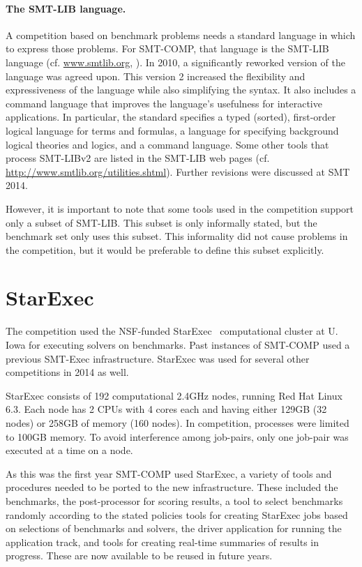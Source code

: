 \documentclass[twoside,11pt]{article}
\begin{document}
\paragraph{The SMT-LIB language.} A competition based on benchmark problems needs a standard language in which to express those problems.
For SMT-COMP, that language is the SMT-LIB language (cf. \url{www.smtlib.org}, \cite{BarST-SMT-10} \cite{Cok-SMTLIBTutorial-2011}). 
In 2010, a significantly reworked version of the language was agreed upon.
This version 2 increased the flexibility and expressiveness of the language while also simplifying the syntax. 
It also includes a command language that improves the language's usefulness for interactive applications.
In particular, the standard specifies a typed (sorted), first-order logical language for terms and formulas, a language for specifying background logical theories and logics, and a command language. Some other tools that process SMT-LIBv2 are listed in the SMT-LIB web pages (cf. \url{http://www.smtlib.org/utilities.shtml}). Further revisions were discussed at SMT 2014.

However, it is important to note that some tools used in the competition support only a subset of SMT-LIB. This subset is only informally stated, but the benchmark set only uses this subset. This informality did not cause problems in the competition, but it would be preferable to define this subset explicitly.

\section{StarExec}
\label{sec:starexec}

The competition used the NSF-funded StarExec~\cite{DBLP:conf/cade/StumpST14} computational cluster at U. Iowa for executing solvers on benchmarks. Past instances of SMT-COMP used a previous SMT-Exec infrastructure. StarExec was used for several other competitions in 2014 as well.

StarExec consists of 192 computational 2.4GHz nodes, running Red Hat Linux 6.3. Each node has 2 CPUs with 4 cores each and having either 129GB (32 nodes) or 258GB of memory (160 nodes). In competition, processes were limited to 100GB memory. To avoid interference among job-pairs, only one job-pair was executed at a time on a node. 


As this was the first year SMT-COMP used StarExec, a variety of tools and procedures needed to be ported to the new infrastructure. 
These included the benchmarks, the post-processor for scoring results, 
a tool to select benchmarks randomly according to the stated policies
tools for creating StarExec jobs based on selections of benchmarks and solvers, 
the driver application for running the application track, 
and tools for creating real-time summaries of results in progress. 
These are now available to be reused in future years.
\end{document}
